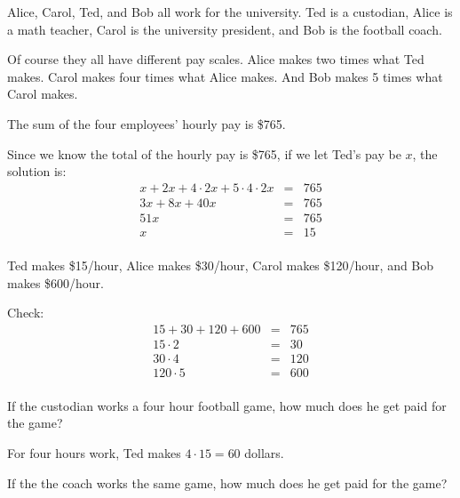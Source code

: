 \documentclass[fleqn,addpoints]{exam}
\begin{document}
\begin{questions}

\question

Alice, Carol, Ted, and Bob all work for the university.  Ted is a custodian, Alice is a math teacher, Carol is the
university president, and Bob is the football coach.   

Of course they all have different pay scales.  Alice makes two times what Ted makes.  Carol makes four times what Alice
makes.  And Bob makes 5 times what Carol makes.

The sum of the four employees' hourly pay is \$765.

\begin{solution}
  Since we know the total of the hourly pay is \$765, if we let Ted's pay be $x$, the solution is:  
  \begin{eqnarray*}
    x + 2x + 4 \cdot 2x + 5 \cdot 4 \cdot 2x & = & 765 \\
    3x + 8x + 40x & = & 765 \\
    51x & = & 765 \\
    x & = & 15 \\
  \end{eqnarray*}

Ted makes \$15/hour, Alice makes \$30/hour, Carol makes \$120/hour, and Bob makes \$600/hour.

Check:
  \begin{eqnarray*}
    15 + 30 + 120 + 600 & = & 765 \\
    15 \cdot 2 & = & 30  \\
    30 \cdot 4 & = & 120 \\
    120 \cdot 5 & = & 600 \\
  \end{eqnarray*}

\end{solution}

\begin{parts}
\begin{part}
    If the custodian works a four hour football game, how much does he get paid for the game?

\begin{solution}
  For four hours work, Ted makes \( 4 \cdot 15 = 60 \) dollars.
\end{solution}

\end{part}

\begin{part}
    If the the coach works the same game, how much does he get paid for the game?


\end{part}
\end{parts}
\end{questions}
\end{document}
